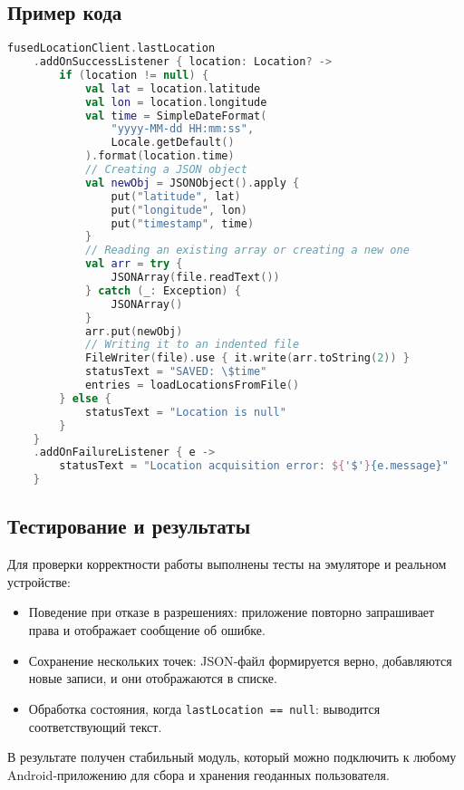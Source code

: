 \subsection*{Пример кода}

\begin{lstlisting}[language=Kotlin, caption={Запись новой локации в файл}]
fusedLocationClient.lastLocation
    .addOnSuccessListener { location: Location? ->
        if (location != null) {
            val lat = location.latitude
            val lon = location.longitude
            val time = SimpleDateFormat(
                "yyyy-MM-dd HH:mm:ss",
                Locale.getDefault()
            ).format(location.time)
            // Creating a JSON object
            val newObj = JSONObject().apply {
                put("latitude", lat)
                put("longitude", lon)
                put("timestamp", time)
            }
            // Reading an existing array or creating a new one
            val arr = try {
                JSONArray(file.readText())
            } catch (_: Exception) {
                JSONArray()
            }
            arr.put(newObj)
            // Writing it to an indented file
            FileWriter(file).use { it.write(arr.toString(2)) }
            statusText = "SAVED: \$time"
            entries = loadLocationsFromFile()
        } else {
            statusText = "Location is null"
        }
    }
    .addOnFailureListener { e ->
        statusText = "Location acquisition error: ${'$'}{e.message}"
    }
\end{lstlisting}

\subsection*{Тестирование и результаты}

Для проверки корректности работы выполнены тесты на эмуляторе и реальном устройстве:
\begin{itemize}
    \item Поведение при отказе в разрешениях: приложение повторно запрашивает права и отображает сообщение об ошибке.
    \item Сохранение нескольких точек: JSON‑файл формируется верно, добавляются новые записи, и они отображаются в списке.
    \item Обработка состояния, когда \texttt{lastLocation == null}: выводится соответствующий текст.
\end{itemize}

В результате получен стабильный модуль, который можно подключить к любому Android‑приложению для сбора и хранения геоданных пользователя.
